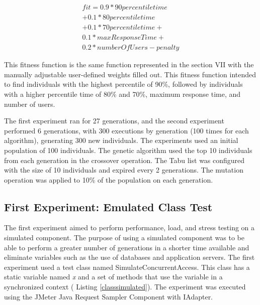 \documentclass{report}
\begin{document}
\begin{equation}
\begin{aligned}
fit=0.9* 90percentiletime\\
+0.1*80percentiletime\\+
0.1*70percentiletime+\\
0.1*maxResponseTime+\\
0.2*numberOfUsers-penalty
\end{aligned}
\end{equation}

This fitness function is the same function represented in the section VII with the manually adjustable user-defined weights filled out. This fitness function intended to find individuals with the highest percentile of 90\%, followed by individuals with a higher percentile time of 80\% and 70\%, maximum response time, and number of users.

The first experiment ran for 27 generations, and the second experiment  performed 6 generations, with 300 executions by generation (100 times for each algorithm),  generating 300 new individuals. The experiments used an initial population of 100 individuals. The genetic algorithm used the top 10 individuals from each generation in the crossover operation. The Tabu list was configured with the size of 10 individuals and expired every 2 generations.  The mutation operation was applied to 10\% of the population on each generation.

\subsection{First Experiment: Emulated Class Test}

The first experiment aimed to perform performance, load, and stress testing on a simulated component. The purpose of using a simulated component was to be able to perform a greater number of generations in a shorter time available and eliminate variables such as the use of databases and application servers. The first experiment used a test class  named SimulateConcurrentAccess. This class has a static variable named \textit{x} and a set of methods that use the variable in a synchronized context ( Listing \ref{classsimulated}). The experiment was executed using the JMeter Java Request Sampler Component with IAdapter.

\end{document}

